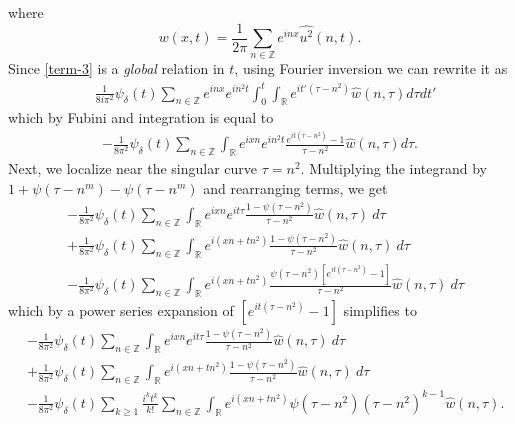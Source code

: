 \documentclass[12pt,reqno]{amsart}
\numberwithin{equation}{section}  %
\newcommand{\rr}{\mathbb{R}}
\newcommand{\zz}{\mathbb{Z}}
\newcommand{\wh}{\widehat}
\begin{document}
where $$w(x,t) = \frac{1}{2\pi} \sum_{n \in \zz}
e^{inx} \wh{u^{2}}(n,t).$$
Since \eqref{term-3} is a \emph{global} relation in $t$, using Fourier inversion
we can rewrite it as
%
%
\begin{equation*}
\begin{split}
  & \frac{1}{8 i \pi^{2} } \psi_{\delta}(t) \sum_{n \in \zz} e^{inx} e^{in^{2}t}
  \int_{0}^{t} \int_{\rr} e^{it'(\tau - n^{2})} \wh{w}(n, \tau) d \tau dt'
\end{split}
\end{equation*}
%
%
which by Fubini and integration is equal to
%
%
\begin{equation*}
\begin{split}
  -\frac{1}{8 \pi^{2}} \psi_{\delta} (t) \sum_{n \in \zz} \int_{\rr} e^{ixn}
  e^{in^{2}t} \frac{e^{it(\tau - n^{2})} -1}{ \tau - n^{2}}\wh{w}(n, \tau) d \tau.
\end{split}
\end{equation*}
%
Next, we localize near the singular curve $\tau =  n^2$.  Multiplying the
integrand by $1 + \psi(\tau -
n^m) - \psi(\tau -
n^m) $ and
rearranging terms, we get
%
%
\begin{equation*}
	\begin{split}
	& - \frac{1}{8 \pi^2} \psi_{\delta}(t) \sum_{n \in \zz} \int_\rr e^{ixn}  
		e^{it \tau} \frac{ 1 - \psi(\tau - n^{2}) 
		}{\tau - n^{2}} \wh{w}(n, \tau) \ d \tau
		\\
		& + \frac{1}{8 \pi^2} \psi_{\delta}(t) \sum_{n \in \zz} \int _\rr e^{i(xn + 
		t n^{2})}
		 \frac{1- \psi(\tau - n^{2})}{\tau - n^{2}} \wh{w}(n, \tau) \ d \tau
		\\
		& - \frac{1}{8 \pi^2} \psi_{\delta}(t) \sum_{n \in \zz} \int_\rr
		e^{i(xn + t n^{2})}
		\frac{\psi(\tau - n^{2})\left[ e^{it(\tau - n^{2})}-1 
		\right]}{\tau - n^{2}} \wh{w}(n, \tau) \ d \tau
	\end{split}
\end{equation*}
%
%
which by a power series expansion of $[e^{it(\tau - n^{2})}-1]$ simplifies  
to
%
%
\begin{align}
		\label{main-int-expression'-2}
		& -\frac{1}{8 \pi^2} \psi_{\delta}(t) \sum_{n\in \zz} \int_\rr e^{ixn}  
		e^{it \tau} \frac{ 1 - \psi(\tau -  n^{2}) 
		}{\tau -  n^{2}} \wh{w}(n, \tau) \ d \tau
		\\
		\label{main-int-expression'-3}
		& + \frac{1}{8 \pi^2} \psi_{\delta}(t) \sum_{n\in \zz} \int_\rr e^{i(xn + 
		t n^{2})}
		 \frac{1- \psi(\tau -  n^{2})}{\tau -  n^{2}} \wh{w}(n, \tau) \ d \tau
		\\
		\label{main-int-expression'-4}
		& - \frac{1}{8 \pi^2} \psi_{\delta}(t) \sum_{k \ge 1} \frac{i^k t^k}{k!}
		\sum_{n \in \zz} \int_\rr e^{i(xn + t n^{2} )}
		\psi(\tau -  n^{2}) (\tau -  n^{2})^{k-1} \wh{w}(n, \tau).
\end{align}
\end{document}
